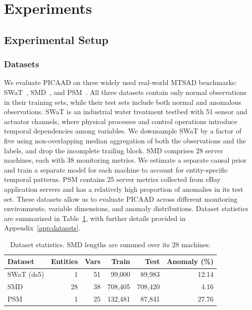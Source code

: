 \section{Experiments}
\label{sec:experiments}

\subsection{Experimental Setup}
\label{sec:experimental_setup}

\subsubsection{Datasets}
\label{sec:datasets}

We evaluate PICAAD on three widely used real-world MTSAD benchmarks: SWaT~\cite{goh2017dataset}, SMD~\cite{su2019robust}, and PSM~\cite{abdulaal2021practical}. All three datasets contain only normal observations in their training sets, while their test sets include both normal and anomalous observations. SWaT is an industrial water treatment testbed with 51 sensor and actuator channels, where physical processes and control operations introduce temporal dependencies among variables. We downsample SWaT by a factor of five using non-overlapping median aggregation of both the observations and the labels, and drop the incomplete trailing block. SMD comprises 28 server machines, each with 38 monitoring metrics. We estimate a separate causal prior and train a separate model for each machine to account for entity-specific temporal patterns. PSM contains 25 server metrics collected from eBay application servers and has a relatively high proportion of anomalies in its test set. These datasets allow us to evaluate PICAAD across different monitoring environments, variable dimensions, and anomaly distributions. Dataset statistics are summarized in Table~\ref{tab:dataset_statistics}, with further details provided in Appendix~\ref{app:datasets}.

\begin{table}[t]
\centering
\caption{Dataset statistics. SMD lengths are summed over its 28 machines.}
\label{tab:dataset_statistics}
\small
\setlength{\tabcolsep}{4pt}
\begin{tabular}{lrrrrr}
\toprule
Dataset & Entities & Vars & Train & Test & Anomaly (\%) \\
\midrule
SWaT (ds5) & 1  & 51 & 99{,}000  & 89{,}983  & 12.14 \\
SMD        & 28 & 38 & 708{,}405 & 708{,}420 & 4.16 \\
PSM        & 1  & 25 & 132{,}481 & 87{,}841  & 27.76 \\
\bottomrule
\end{tabular}
\end{table}

